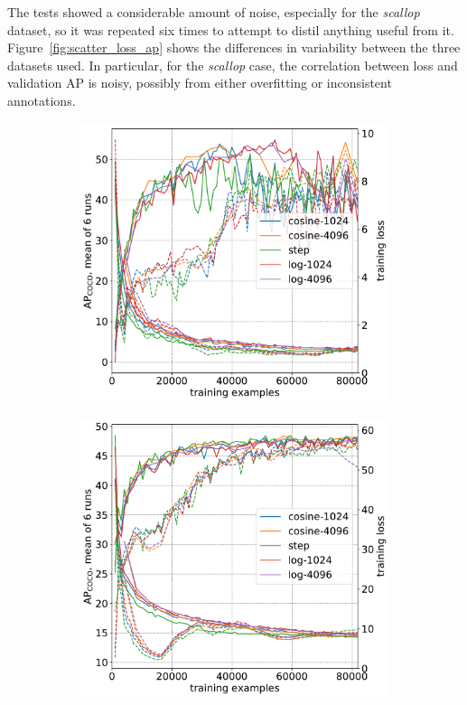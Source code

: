 The tests showed a considerable amount of noise, especially for the \emph{scallop} dataset, so it was repeated six times to attempt to distil anything useful from it. Figure~\ref{fig:scatter_loss_ap} shows the differences in variability between the three datasets used. In particular, for the \emph{scallop} case, the correlation between loss and validation \gls{AP} is noisy, possibly from either overfitting or inconsistent annotations.

\begin{figure}[h]
\centering
\begin{subfigure}[t]{0.5\linewidth}
  \includegraphics[width=1.0\linewidth]{charts/training/lr_schedule/scallops.pdf}
  \caption{}
\end{subfigure}%
\begin{subfigure}[t]{0.5\linewidth}
  \includegraphics[width=1.0\linewidth]{charts/training/lr_schedule/apples.pdf}

\end{subfigure}
\end{figure}

